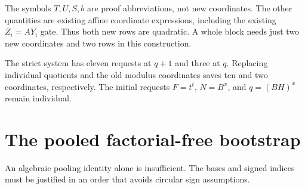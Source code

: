 \documentclass[11pt,letterpaper]{article}
\theoremstyle{remark}
\begin{document}
The symbols \(T,U,S,b\) are proof abbreviations, not new
coordinates. The other quantities are existing affine coordinate
expressions, including the existing \(Z_i=AY_i\) gate. Thus both
new rows are quadratic. A whole block needs just two new
coordinates and two rows in this construction.

The strict system has eleven requests at \(q+1\) and three at \(q\).
Replacing individual quotients and the old modulus coordinates saves
ten and two coordinates, respectively. The initial requests
\(F=t^t\), \(N=B^x\), and \(q=(BH)^x\) remain individual.

\section{The pooled factorial-free bootstrap}\label{sec:bootstrap}

An algebraic pooling identity alone is insufficient. The bases and
signed indices must be justified in an order that avoids circular
sign assumptions.
\end{document}
